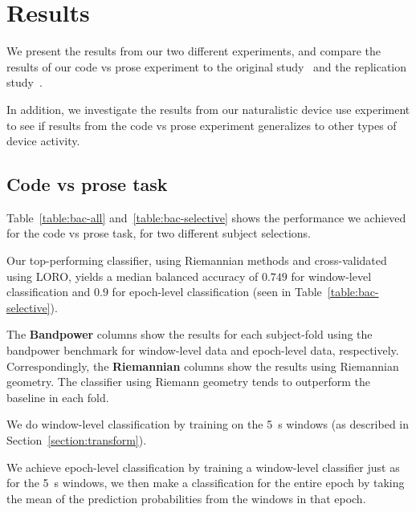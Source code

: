 \chapter{Results}\label{section:results}

    We present the results from our two different experiments, and compare the results of our code vs prose experiment to the original study~\cite{floyd_decoding_2017} and the replication study~\cite{fucci_replication_2019}. 

    In addition, we investigate the results from our naturalistic device use experiment to see if results from the code vs prose experiment generalizes to other types of device activity.

    \section{Code vs prose task}
        Table~\ref{table:bac-all} and~\ref{table:bac-selective} shows the performance we achieved for the code vs prose task, for two different subject selections.

        Our top-performing classifier, using Riemannian methods and cross-validated using LORO, yields a median balanced accuracy of $0.749$  for window-level classification and $0.9$ for epoch-level classification (seen in Table~\ref{table:bac-selective}).

        The \textbf{Bandpower} columns show the results for each subject-fold using the bandpower benchmark for window-level data and epoch-level data, respectively. Correspondingly, the \textbf{Riemannian} columns show the results using Riemannian geometry. The classifier using Riemann geometry tends to outperform the baseline in each fold.

        We do window-level classification by training on the \SI{5}{\second} windows (as described in Section~\ref{section:transform}).

        We achieve epoch-level classification by training a window-level classifier just as for the \SI{5}{\second} windows, we then make a classification for the entire epoch by taking the mean of the prediction probabilities from the windows in that epoch.

